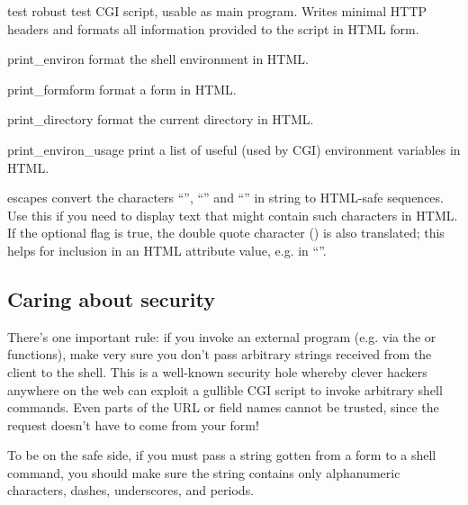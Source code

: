 \begin{funcdesc}{test}{}
robust test CGI script, usable as main program.
    Writes minimal HTTP headers and formats all information provided to
    the script in HTML form.
\end{funcdesc}

\begin{funcdesc}{print_environ}{}
format the shell environment in HTML.
\end{funcdesc}

\begin{funcdesc}{print_form}{form}
format a form in HTML.
\end{funcdesc}

\begin{funcdesc}{print_directory}{}
format the current directory in HTML.
\end{funcdesc}

\begin{funcdesc}{print_environ_usage}{}
print a list of useful (used by CGI) environment variables in
HTML.
\end{funcdesc}

\begin{funcdesc}{escape}{s}
convert the characters
``\code{\&}'', ``\code{<}'' and ``\code{>}'' in string  to HTML-safe
sequences.  Use this if you need to display text that might contain
such characters in HTML.  If the optional flag  is true,
the double quote character () is also translated; this helps
for inclusion in an HTML attribute value, e.g. in ``''.
\end{funcdesc}


\subsection{Caring about security}

There's one important rule: if you invoke an external program (e.g.
via the  or  functions), make very sure you don't
pass arbitrary strings received from the client to the shell.  This is
a well-known security hole whereby clever hackers anywhere on the web
can exploit a gullible CGI script to invoke arbitrary shell commands.
Even parts of the URL or field names cannot be trusted, since the
request doesn't have to come from your form!

To be on the safe side, if you must pass a string gotten from a form
to a shell command, you should make sure the string contains only
alphanumeric characters, dashes, underscores, and periods.


